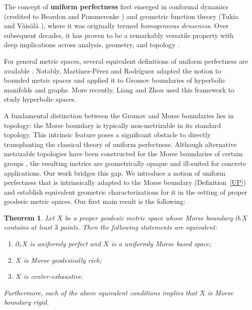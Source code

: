 \documentclass[a4paper,11pt,oneside]{article}
\newtheorem{Theorem}{Theorem}[section]
\begin{document}
The concept of \textbf{uniform perfectness} first emerged in conformal dynamics (credited to Beardon and Pommerenke \cite{BeardonPommerenke78, Pommerenke79}) and geometric function theory (Tukia and Väisälä \hspace{0pt}\cite{Tukia80}), where it was originally termed \textit{homogeneous denseness}.
Over subsequent decades, it has proven to be a remarkably versatile property with deep implications across analysis, geometry, and topology \cite{BJ97, Canary91, HR95, JV96, MacManusN-Palka99, MAR18, McMullen90, McMullen98, Sugawa2001, Sugawa01, Vuorinen84}. 

For general metric spaces, several equivalent definitions of uniform perfectness are available \cite{MAR18, Nowak12, Sugawa01}. Notably, Martínez-Pérez and Rodríguez \cite{MAR18} adapted the notion to bounded metric spaces and applied it to Gromov boundaries of hyperbolic manifolds and graphs. More recently, Liang and Zhou \cite{LiangZhou24} used this framework to study hyperbolic spaces.

A fundamental distinction between the Gromov and Morse boundaries lies in topology: the Morse boundary is typically non‑metrizable in its standard topology. This intrinsic feature poses a significant obstacle to directly transplanting the classical theory of uniform perfectness.
Although alternative metrizable topologies have been constructed for the Morse boundaries of certain groups \cite{Cashen19, CordesDussauleGekhtman22, qing24}, the resulting metrics are geometrically opaque and ill‑suited for concrete applications. 
Our work bridges this gap. We introduce a notion of uniform perfectness that is intrinsically adapted to the Morse boundary (Definition~\ref{UP}) and establish equivalent geometric characterizations for it in the setting of proper geodesic metric spaces. Our first main result is the following:
 
\begin{Theorem}\label{thm:equivalence}
Let $X$ be a proper geodesic metric space whose Morse boundary $\partial_*X$ contains at least $3$ points. Then the following statements are equivalent:
\begin{enumerate}
    \item $\partial_*X$ is uniformly perfect and $X$ is a uniformly Morse based space;
    \item $X$ is Morse geodesically rich;
    \item $X$ is center-exhaustive.
\end{enumerate}
Furthermore, each of the above equivalent conditions implies that $X$ is Morse boundary rigid.
\end{Theorem}
\end{document}
